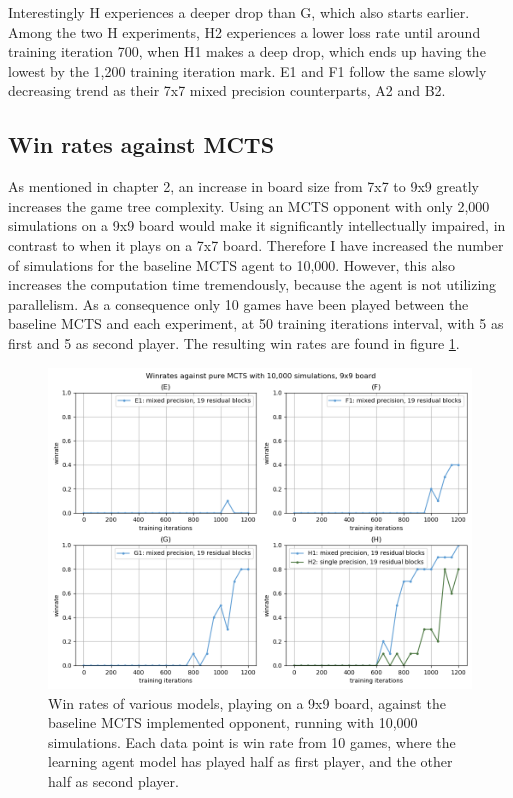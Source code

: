 Interestingly H experiences a deeper drop than G, which also starts earlier. Among the two H experiments, H2 experiences a lower loss rate until around training iteration 700, when H1 makes a deep drop, which ends up having the lowest by the 1,200 training iteration mark. E1 and F1 follow the same slowly decreasing trend as their 7x7 mixed precision counterparts, A2 and B2.

\subsection{Win rates against MCTS}
As mentioned in chapter 2, an increase in board size from 7x7 to 9x9 greatly increases the game tree complexity. Using an MCTS opponent with only 2,000 simulations on a 9x9 board would make it significantly intellectually impaired, in contrast to when it plays on a 7x7 board. Therefore I have increased the number of simulations for the baseline MCTS agent to 10,000. However, this also increases the computation time tremendously, because the agent is not utilizing parallelism. As a consequence only 10 games have been played between the baseline MCTS and each experiment, at 50 training iterations interval, with 5 as first and 5 as second player. The resulting win rates are found in figure \ref{fig-win-9}.

\begin{figure}[ht]
	\centering
	\includegraphics[width=1\textwidth]{figures/winrates-9x9}
	\caption{Win rates of various models, playing on a 9x9 board, against the baseline MCTS implemented opponent, running with 10,000 simulations. Each data point is win rate from 10 games, where the learning agent model has played half as first player, and the other half as second player.}
	\label{fig-win-9}
\end{figure}

